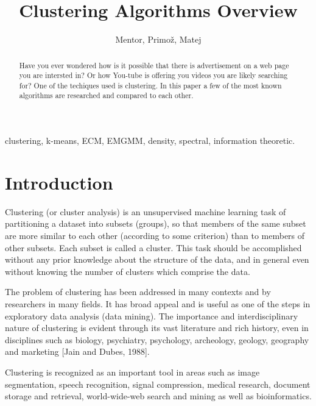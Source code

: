 \documentclass[conference]{IEEEtran}
\begin{document}
\title{Clustering Algorithms Overview}
\author{Mentor, Primož, Matej}
\maketitle

\begin{abstract}
Have you ever wondered how is it possible that there is advertisement on a web page you
are intersted in? Or how You-tube is offering you videos you are likely searching for? 
One of the techiques used is clustering. In this paper a few of the most known
algorithms are researched and compared to each other.
\end{abstract}

\begin{IEEEkeywords}
clustering, k-means, ECM, EMGMM, density, spectral, information theoretic.
\end{IEEEkeywords}

\section{Introduction}
Clustering (or cluster analysis) is an unsupervised machine learning task of partitioning
a dataset into subsets (groups), so that members of the same subset are more similar to each other
(according to some criterion) than to members of other subsets. Each subset is called a cluster.
This task should be accomplished without any prior knowledge about the structure of the data, and in general
even without knowing the number of clusters which comprise the data.

The problem of clustering has been addressed in many contexts and by researchers in many fields. It has
broad appeal and is useful as one of the steps in exploratory data analysis (data mining). The importance
and interdisciplinary nature of clustering is evident through its vast literature and rich history, even
in disciplines such as biology, psychiatry, psychology, archeology, geology, geography and
marketing [Jain and Dubes, 1988].

Clustering is recognized as an important tool in areas such as image segmentation,
speech recognition, signal compression, medical research, document storage and retrieval,
world-wide-web search and mining as well as bioinformatics.
\end{document}
